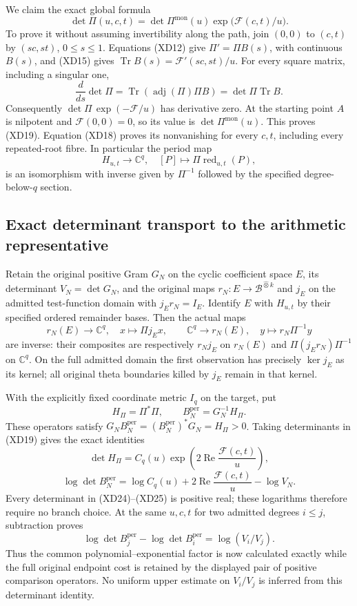 \documentclass{article}
\begin{document}
We claim the exact global formula
\[
 \boxed{\det\Pi(u,c,t)=\det\Pi^{\mathrm{mon}}(u)
                 \exp\bigl(\mathcal F(c,t)/u\bigr).}
 \tag{XD19}
\]
To prove it without assuming invertibility along the path, join
$(0,0)$ to $(c,t)$ by $(sc,st)$, $0\leq s\leq1$.
Equations (XD12) give $\Pi'=\Pi B(s)$, with continuous $B(s)$,
and (XD15) gives $\operatorname{Tr}B(s)=\mathcal F'(sc,st)/u$.
For every square matrix, including a singular one,
\[
 \frac{d}{ds}\det\Pi
 =\operatorname{Tr}(\operatorname{adj}(\Pi)\Pi B)
 =\det\Pi\operatorname{Tr}B.
 \tag{XD20}
\]
Consequently $\det\Pi\,\exp(-\mathcal F/u)$ has derivative zero.
At the starting point $A$ is nilpotent and $\mathcal F(0,0)=0$,
so its value is $\det\Pi^{\mathrm{mon}}(u)$. This proves (XD19).
Equation (XD18) proves its nonvanishing for every $c,t$, including
every repeated-root fibre. In particular the period map
\[
 H_{u,t}\longrightarrow\mathbb C^q,
 \quad[P]\longmapsto\Pi\operatorname{red}_{u,t}(P),
 \tag{XD21}
\]
is an isomorphism with inverse given by $\Pi^{-1}$ followed by
the specified degree-below-$q$ section.

\subsection{Exact determinant transport to the arithmetic representative}

Retain the original positive Gram $G_N$ on the cyclic coefficient
space $E$, its determinant $V_N=\det G_N$, and the original maps
$r_N:E\longrightarrow\mathscr B^{\widehat\otimes k}$ and
$j_E$ on the admitted test-function domain with $j_Er_N=I_E$.
Identify $E$ with $H_{u,t}$ by their specified ordered remainder
bases. Then the actual maps
\[
 r_N(E)\longrightarrow\mathbb C^q,\quad x\longmapsto\Pi j_Ex,
 \qquad
 \mathbb C^q\longrightarrow r_N(E),\quad y\longmapsto r_N\Pi^{-1}y
 \tag{XD22}
\]
are inverse: their composites are respectively $r_Nj_E$ on
$r_N(E)$ and $\Pi(j_Er_N)\Pi^{-1}$ on $\mathbb C^q$.
On the full admitted domain the first observation has precisely
$\ker j_E$ as its kernel; all original theta boundaries killed by
$j_E$ remain in that kernel.

With the explicitly fixed coordinate metric $I_q$ on the target,
put
\[
 H_\Pi=\Pi^*\Pi,\qquad B_N^{\mathrm{per}}=G_N^{-1}H_\Pi.
 \tag{XD23}
\]
These operators satisfy
$G_NB_N^{\mathrm{per}}=(B_N^{\mathrm{per}})^*G_N=H_\Pi>0$.
Taking determinants in (XD19) gives the exact identities
\[
 \det H_\Pi=C_q(u)
       \exp\!\left(2\operatorname{Re}\frac{\mathcal F(c,t)}u\right),
 \tag{XD24}
\]
\[
 \boxed{\log\det B_N^{\mathrm{per}}
 =\log C_q(u)+2\operatorname{Re}\frac{\mathcal F(c,t)}u-\log V_N.}
 \tag{XD25}
\]
Every determinant in (XD24)--(XD25) is positive real; these
logarithms therefore require no branch choice. At the same $u,c,t$
for two admitted degrees $i\leq j$, subtraction proves
\[
 \boxed{\log\det B_j^{\mathrm{per}}-
        \log\det B_i^{\mathrm{per}}=\log(V_i/V_j).}
 \tag{XD26}
\]
Thus the common polynomial--exponential factor is now calculated
exactly while the full original endpoint cost is retained by the
displayed pair of positive comparison operators. No uniform upper
estimate on $V_i/V_j$ is inferred from this determinant identity.
\end{document}
